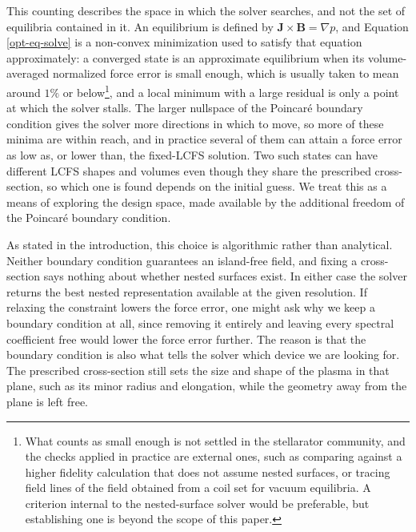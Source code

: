 \documentclass{jpp}
\newcommand{\note}[1]{{\color{red}#1}}
\begin{document}

\note{This counting describes the space in which the solver searches, and not the set of equilibria contained in it. An equilibrium is defined by $\mathbf{J}\times\mathbf{B}=\nabla p$, and Equation \ref{opt-eq-solve} is a non-convex minimization used to satisfy that equation approximately: a converged state is an approximate equilibrium when its volume-averaged normalized force error is small enough, which is usually taken to mean around $1\%$ or below\footnote{What counts as small enough is not settled in the stellarator community, and the checks applied in practice are external ones, such as comparing against a higher fidelity calculation that does not assume nested surfaces, or tracing field lines of the field obtained from a coil set for vacuum equilibria. A criterion internal to the nested-surface solver would be preferable, but establishing one is beyond the scope of this paper.}, and a local minimum with a large residual is only a point at which the solver stalls. The larger nullspace of the Poincaré boundary condition gives the solver more directions in which to move, so more of these minima are within reach, and in practice several of them can attain a force error as low as, or lower than, the fixed-LCFS solution. Two such states can have different LCFS shapes and volumes even though they share the prescribed cross-section, so which one is found depends on the initial guess. We treat this as a means of exploring the design space, made available by the additional freedom of the Poincaré boundary condition.}

As stated in the introduction, this choice is algorithmic rather than analytical. Neither boundary condition guarantees an island-free field, and fixing a cross-section says nothing about whether nested surfaces exist. In either case the solver returns the best nested representation available at the given resolution. If relaxing the constraint lowers the force error, one might ask why we keep a boundary condition at all, since removing it entirely and leaving every spectral coefficient free would lower the force error further. The reason is that the boundary condition is also what tells the solver which device we are looking for. The prescribed cross-section still sets the size and shape of the plasma in that plane, such as its minor radius and elongation, while the geometry away from the plane is left free.
\end{document}

